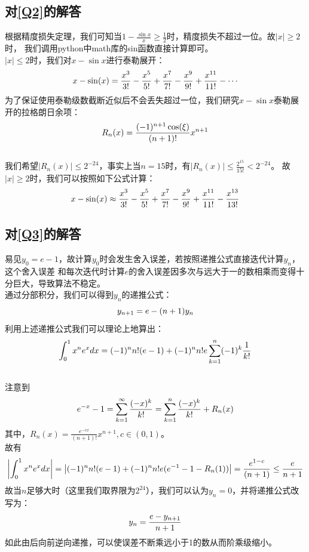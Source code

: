 \documentclass[a4paper,11pt,notitlepage]{article}
\begin{document}
\subsection{对\ref{Q2}的解答}
根据精度损失定理，我们可知当$1-\frac{\sin{x}}{x}\geq\frac{1}{2}$时，精度损失不超过一位。故$\left|x\right|\geq2$时，
我们调用python中math库的sin函数直接计算即可。\\
\indent $\left|x\right|\leq2$时，我们对$x-\sin{x}$进行泰勒展开：
\begin{equation}
    x-\sin(x) = \frac{x^3}{3!} - \frac{x^5}{5!} + \frac{x^7}{7!} - \frac{x^9}{9!} + \frac{x^{11}}{11!} - \cdots\notag
\end{equation}
为了保证使用泰勒级数截断近似后不会丢失超过一位，我们研究$x-\sin{x}$泰勒展开的拉格朗日余项：
\begin{equation}
    R_n(x) = \frac{(-1)^{n+1}\cos(\xi)}{(n+1)!}x^{n+1}\notag
\end{equation}
\\我们希望$\left|R_n(x)\right|\leq2^{-24}$，事实上当$n=15$时，有$\left|R_n(x)\right|\leq\frac{2^{15}}{15!}<2^{-24}$。
故$\left|x\right|\geq2$时，我们可以按照如下公式计算：
\begin{equation}
    x-\sin(x) \approx \frac{x^3}{3!} - \frac{x^5}{5!} + \frac{x^7}{7!} - \frac{x^9}{9!} + \frac{x^{11}}{11!} - \frac{x^{13}}{13!}\notag
\end{equation}

\subsection{对\ref{Q3}的解答}
易见$y_{0}=e-1$，故计算$y_{0}$时会发生舍入误差，若按照递推公式直接迭代计算$y_{n}$，这个舍入误差
和每次迭代时计算$e$的舍入误差因多次与远大于一的数相乘而变得十分巨大，导致算法不稳定。\\
\indent 通过分部积分，我们可以得到$y_{n}$的递推公式：
\begin{equation}
    y_{n+1}=e-(n+1)y_{n}\notag
\end{equation}
利用上述递推公式我们可以理论上地算出：
\begin{equation}
    \int_{0}^{1} x^{n}e^{x} dx = (-1)^n n! (e-1) + (-1)^n n! e \sum_{k=1}^{n} (-1)^k \frac{1}{k!} \notag
\end{equation}
\\注意到
\begin{equation}
    e^{-x}-1=\sum_{k=1}^{\infty}\frac{(-x)^k}{k!}=\sum_{k=1}^{n}\frac{(-x)^k}{k!} + R_{n}(x)\notag
\end{equation}
其中，$R_n(x) = \frac{e^{-cx} }{(n+1)!}x^{n+1},c\in(0,1)$。\\
故有
\begin{equation}
    \left|\int_{0}^{1} x^{n}e^{x} dx \right|= \left|(-1)^n n! (e-1) + (-1)^n n! e (e^{-1}-1-R_{n}(1))\right|
    = \frac{e^{1-c}}{(n+1)}
    \leq \frac{e}{n+1}\notag
\end{equation}
故当$n$足够大时（这里我们取界限为$2^{24}$），我们可以认为$y_{n}=0$，并将递推公式改写为：
\begin{equation}
    y_{n}=\frac{e-y_{n+1}}{n+1}\notag
\end{equation}
如此由后向前逆向递推，可以使误差不断乘远小于1的数从而阶乘级缩小。
\end{document}
